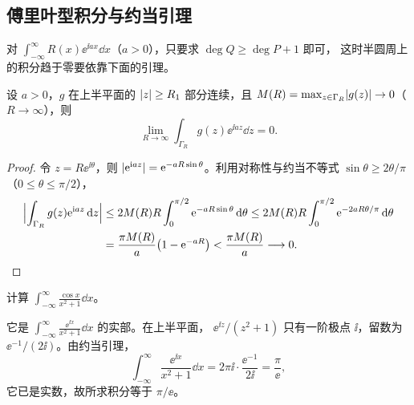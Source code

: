 \documentclass{mojing-notes}
\begin{document}
\subsection{傅里叶型积分与约当引理}

对 $\int_{-\infty}^{\infty}R(x)\ee^{\ii ax}\dd x$（$a>0$），只要求 $\deg Q\ge\deg P+1$ 即可，
这时半圆周上的积分趋于零要依靠下面的引理。

\begin{lemma}[约当]\label{lem:jordan}
设 $a>0$，$g$ 在上半平面的 $\abs{z}\ge R_1$ 部分连续，且
$M(R)=\max_{z\in\Gamma_R}\abs{g(z)}\to0$（$R\to\infty$），则
\[
  \lim_{R\to\infty}\int_{\Gamma_R}g(z)\ee^{\ii az}\dd z=0 .
\]
\end{lemma}

\begin{marginfigure}[1\baselineskip]
\caption{约当不等式：在 $[0,\frac{\pi}{2}]$ 上 $\sin\theta\ge\frac{2\theta}{\pi}$}
\label{fig:jordan}
\end{marginfigure}

\begin{proof}
令 $z=R\ee^{\ii\theta}$，则 $\abs{\ee^{\ii az}}=\ee^{-aR\sin\theta}$。利用对称性与约当不等式
$\sin\theta\ge2\theta/\pi$（$0\le\theta\le\pi/2$），
\begin{align*}
  \abs[\Big]{\int_{\Gamma_R}g(z)\ee^{\ii az}\dd z}
  &\le 2M(R)R\int_0^{\pi/2}\ee^{-aR\sin\theta}\dd\theta
   \le 2M(R)R\int_0^{\pi/2}\ee^{-2aR\theta/\pi}\dd\theta \\
  &=\frac{\pi M(R)}{a}\bigl(1-\ee^{-aR}\bigr)<\frac{\pi M(R)}{a}\longrightarrow0 . \qedhere
\end{align*}
\end{proof}

\begin{example}
计算 $\displaystyle\int_{-\infty}^{\infty}\frac{\cos x}{x^2+1}\dd x$。
\end{example}

\begin{solution}
它是 $\int_{-\infty}^\infty\frac{\ee^{\ii x}}{x^2+1}\dd x$ 的实部。在上半平面，
$\ee^{\ii z}/(z^2+1)$ 只有一阶极点 $\ii$，留数为 $\ee^{-1}/(2\ii)$。由约当引理，
\[
  \int_{-\infty}^{\infty}\frac{\ee^{\ii x}}{x^2+1}\dd x=2\pi\ii\cdot\frac{\ee^{-1}}{2\ii}=\frac{\pi}{\ee},
\]
它已是实数，故所求积分等于 $\pi/\ee$。
\end{solution}
\end{document}
